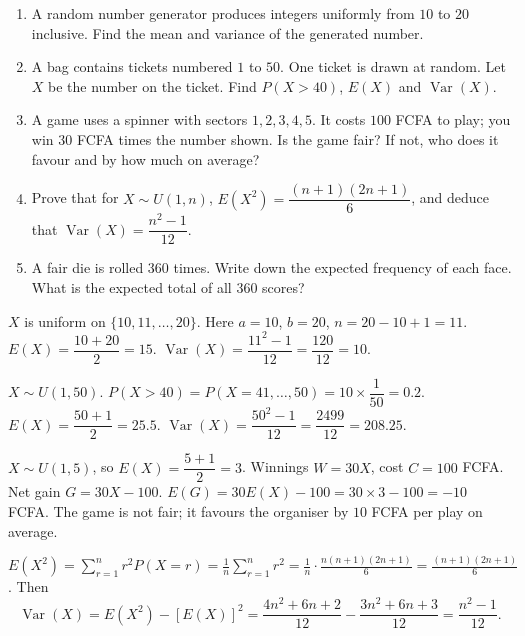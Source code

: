 \documentclass[11pt]{article}
\begin{document}
\begin{exercice}
\begin{enumerate}
\item A random number generator produces integers uniformly from $10$ to $20$ inclusive. Find the mean and variance of the generated number.
\item A bag contains tickets numbered $1$ to $50$. One ticket is drawn at random. Let $X$ be the number on the ticket. Find $P(X>40)$, $E(X)$ and $\operatorname{Var}(X)$.
\item A game uses a spinner with sectors $1,2,3,4,5$. It costs $100$ FCFA to play; you win $30$ FCFA times the number shown. Is the game fair? If not, who does it favour and by how much on average?
\item Prove that for $X\sim U(1,n)$, $E(X^2)=\dfrac{(n+1)(2n+1)}{6}$, and deduce that $\operatorname{Var}(X)=\dfrac{n^2-1}{12}$.
\item A fair die is rolled $360$ times. Write down the expected frequency of each face. What is the expected total of all $360$ scores?
\end{enumerate}
\end{exercice}

\begin{corrige}[Exercise 1]
$X$ is uniform on $\{10,11,\dots,20\}$. Here $a=10$, $b=20$, $n=20-10+1=11$.
$E(X)=\dfrac{10+20}{2}=15$.
$\operatorname{Var}(X)=\dfrac{11^2-1}{12}=\dfrac{120}{12}=10$.
\end{corrige}

\begin{corrige}[Exercise 2]
$X\sim U(1,50)$.
$P(X>40)=P(X=41,\dots,50)=10\times\dfrac{1}{50}=0.2$.
$E(X)=\dfrac{50+1}{2}=25.5$.
$\operatorname{Var}(X)=\dfrac{50^2-1}{12}=\dfrac{2499}{12}=208.25$.
\end{corrige}

\begin{corrige}[Exercise 3]
$X\sim U(1,5)$, so $E(X)=\dfrac{5+1}{2}=3$.
Winnings $W=30X$, cost $C=100$ FCFA.
Net gain $G=30X-100$.
$E(G)=30E(X)-100=30\times3-100=-10$ FCFA.
The game is not fair; it favours the organiser by $10$ FCFA per play on average.
\end{corrige}

\begin{corrige}[Exercise 4]
$E(X^2)=\displaystyle\sum_{r=1}^n r^2 P(X=r)=\frac{1}{n}\sum_{r=1}^n r^2=\frac{1}{n}\cdot\frac{n(n+1)(2n+1)}{6}=\frac{(n+1)(2n+1)}{6}$.
Then
\[
\operatorname{Var}(X)=E(X^2)-[E(X)]^2=\frac{4n^2+6n+2}{12}-\frac{3n^2+6n+3}{12}=\frac{n^2-1}{12}.
\]
\end{corrige}
\end{document}
